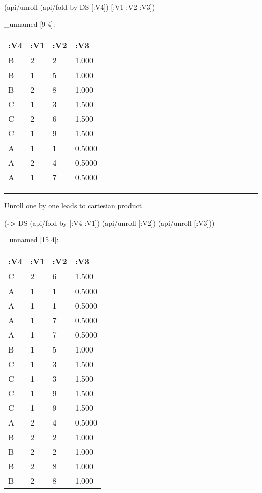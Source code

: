 \documentclass[]{article}
\newenvironment{Shaded}{\begin{snugshade}}{\end{snugshade}}
\newcommand{\KeywordTok}[1]{\textcolor[rgb]{0.13,0.29,0.53}{\textbf{#1}}}
\newcommand{\AttributeTok}[1]{\textcolor[rgb]{0.77,0.63,0.00}{#1}}
\newcommand{\NormalTok}[1]{#1}
\begin{document}
\begin{Shaded}
\begin{Highlighting}[]
\NormalTok{(api/unroll (api/fold-by DS [}\AttributeTok{:V4}\NormalTok{]) [}\AttributeTok{:V1} \AttributeTok{:V2} \AttributeTok{:V3}\NormalTok{])}
\end{Highlighting}
\end{Shaded}

\_unnamed {[}9 4{]}:

\begin{longtable}[]{@{}llll@{}}
\toprule
:V4 & :V1 & :V2 & :V3\tabularnewline
\midrule
\endhead
B & 2 & 2 & 1.000\tabularnewline
B & 1 & 5 & 1.000\tabularnewline
B & 2 & 8 & 1.000\tabularnewline
C & 1 & 3 & 1.500\tabularnewline
C & 2 & 6 & 1.500\tabularnewline
C & 1 & 9 & 1.500\tabularnewline
A & 1 & 1 & 0.5000\tabularnewline
A & 2 & 4 & 0.5000\tabularnewline
A & 1 & 7 & 0.5000\tabularnewline
\bottomrule
\end{longtable}

\begin{center}\rule{0.5\linewidth}{0.5pt}\end{center}

Unroll one by one leads to cartesian product

\begin{Shaded}
\begin{Highlighting}[]
\NormalTok{(}\KeywordTok{->}\NormalTok{ DS}
\NormalTok{    (api/fold-by [}\AttributeTok{:V4} \AttributeTok{:V1}\NormalTok{])}
\NormalTok{    (api/unroll [}\AttributeTok{:V2}\NormalTok{])}
\NormalTok{    (api/unroll [}\AttributeTok{:V3}\NormalTok{]))}
\end{Highlighting}
\end{Shaded}

\_unnamed {[}15 4{]}:

\begin{longtable}[]{@{}llll@{}}
\toprule
:V4 & :V1 & :V2 & :V3\tabularnewline
\midrule
\endhead
C & 2 & 6 & 1.500\tabularnewline
A & 1 & 1 & 0.5000\tabularnewline
A & 1 & 1 & 0.5000\tabularnewline
A & 1 & 7 & 0.5000\tabularnewline
A & 1 & 7 & 0.5000\tabularnewline
B & 1 & 5 & 1.000\tabularnewline
C & 1 & 3 & 1.500\tabularnewline
C & 1 & 3 & 1.500\tabularnewline
C & 1 & 9 & 1.500\tabularnewline
C & 1 & 9 & 1.500\tabularnewline
A & 2 & 4 & 0.5000\tabularnewline
B & 2 & 2 & 1.000\tabularnewline
B & 2 & 2 & 1.000\tabularnewline
B & 2 & 8 & 1.000\tabularnewline
B & 2 & 8 & 1.000\tabularnewline
\bottomrule
\end{longtable}
\end{document}
